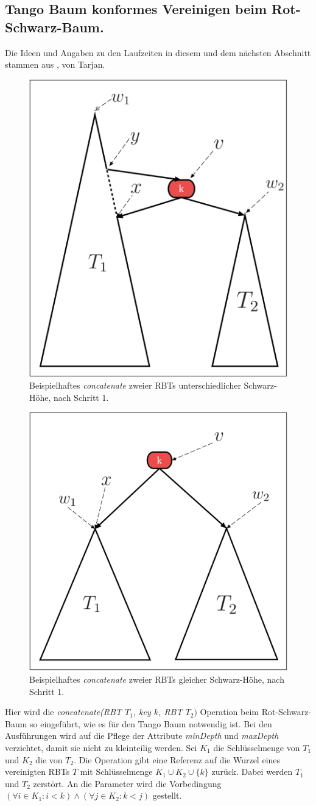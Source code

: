 \documentclass[a4paper,12pt]{article}
\begin{document}
\subsection{Tango Baum konformes Vereinigen beim Rot-Schwarz-Baum.} \label{vereinigen}
Die Ideen und Angaben zu den Laufzeiten in diesem und dem nächsten Abschnitt stammen aus \cite{conSplit}, von Tarjan.
\begin{figure}[H]
	\centering
	\includegraphics[height= 0.6\textwidth]{Medien/RotSchwarzBaum/vereinigen}
	\caption{Beispielhaftes \textit{concatenate} zweier RBTs unterschiedlicher Schwarz-Höhe, nach Schritt 1. }
	\label{fig:vereinigen}
\end{figure}
\begin{figure}[H]
	\centering
	\includegraphics[height= 0.6\textwidth]{Medien/RotSchwarzBaum/vereinigen2}
	\caption{Beispielhaftes \textit{concatenate} zweier RBTs gleicher Schwarz-Höhe, nach Schritt 1. }
	\label{fig:vereinigen2}
\end{figure}
\noindent Hier wird die \textit{concatenate(RBT $T_1$, key $k$, RBT $T_2)$} Operation beim Rot-Schwarz-Baum so eingeführt, wie es für den Tango Baum notwendig ist. Bei den Ausführungen wird auf die Pflege der Attribute  \textit{minDepth} und \textit{maxDepth} verzichtet, damit sie nicht zu kleinteilig werden. Sei $K_1$ die Schlüsselmenge von $T_1$ und $K_2$ die von $T_2$. Die Operation gibt eine Referenz auf die Wurzel eines vereinigten RBTs $T$ mit Schlüsselmenge $K_1 \cup K_2 \cup \{k\} $ zurück. Dabei werden $T_1$ und $T_2$ zerstört. An die Parameter wird die Vorbedingung $(\forall i \in K_1: i < k ) \land (\forall j \in K_2: k < j )$ gestellt.\\
\end{document}
